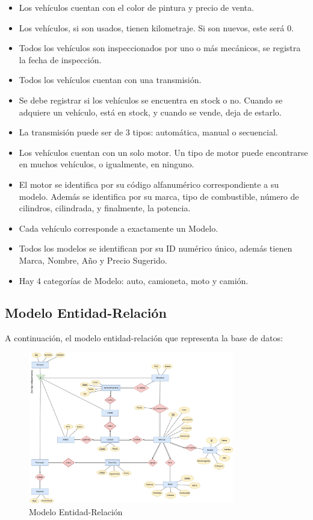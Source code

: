\documentclass[12pt]{article}
\begin{document}
\begin{itemize}
\item Los vehículos cuentan con el color de pintura y precio de venta.
\item Los vehículos, si son usados, tienen kilometraje. Si son nuevos, este será 0.
\item Todos los vehículos son inspeccionados por uno o más mecánicos, se registra la fecha de inspección.
\item Todos los vehículos cuentan con una transmisión.
\item Se debe registrar si los vehículos se encuentra en stock o no. Cuando se adquiere un vehículo, está en stock, y cuando se vende, deja de estarlo.
\item La transmisión puede ser de 3 tipos: automática, manual o secuencial.
\item Los vehículos cuentan con un solo motor. Un tipo de motor puede encontrarse en muchos vehículos, o igualmente, en ninguno.
\item El motor se identifica por su código alfanumérico correspondiente a su modelo. Además se identifica por su marca, tipo de combustible, número de cilindros, cilindrada, y finalmente, la potencia.
\item Cada vehículo corresponde a exactamente un Modelo.
\item Todos los modelos se identifican por su ID numérico único, además tienen Marca, Nombre, Año y Precio Sugerido.
\item Hay 4 categorías de Modelo: auto, camioneta, moto y camión.
\end{itemize}

\subsection{Modelo Entidad-Relaci\'on}

A continuación, el modelo entidad-relación que representa la base de datos:

\begin{figure}
\centering
\includegraphics[width=0.8\textwidth]{ER.jpg}
\caption{Modelo Entidad-Relación}
\end{figure}
\end{document}
